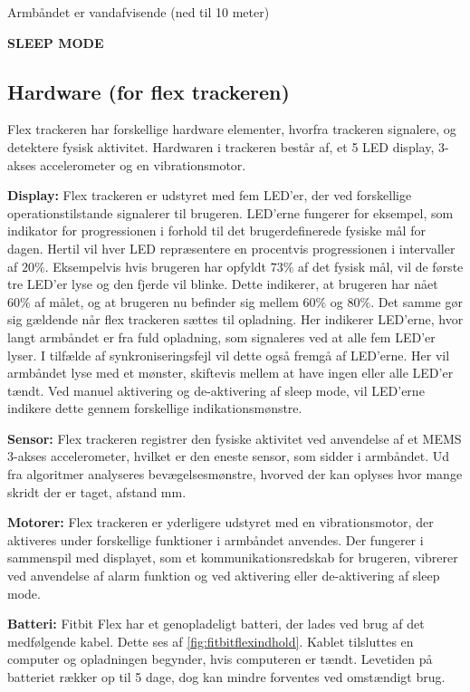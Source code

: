 Armbåndet er vandafvisende (ned til 10 meter) 

\textbf{SLEEP MODE}


\subsection{Hardware (for flex trackeren)}
Flex trackeren har forskellige hardware elementer, hvorfra trackeren signalere, og detektere fysisk aktivitet. Hardwaren i trackeren består af, et 5 LED display, 3-akses accelerometer og en vibrationsmotor.
 
\textbf{Display:} 
Flex trackeren er udstyret med fem LED'er, der ved forskellige operationstilstande signalerer til brugeren. 
LED'erne fungerer for eksempel, som indikator for progressionen i forhold til det brugerdefinerede fysiske mål for dagen. Hertil vil hver LED repræsentere en procentvis progressionen i intervaller af $20 \%$. Eksempelvis hvis brugeren har opfyldt $73 \%$ af det fysisk mål, vil de første tre LED'er lyse og den fjerde vil blinke. Dette indikerer, at brugeren har nået $60 \%$ af målet, og at brugeren nu befinder sig mellem $60 \%$ og $80 \%$. 
Det samme gør sig gældende når flex trackeren sættes til opladning. Her indikerer LED'erne, hvor langt armbåndet er fra fuld opladning, som signaleres ved at alle fem LED'er lyser. 
I tilfælde af synkroniseringsfejl vil dette også fremgå af LED'erne. Her vil armbåndet lyse med et mønster, skiftevis mellem at have ingen eller alle LED'er tændt. 
Ved manuel aktivering og de-aktivering af sleep mode, vil LED'erne indikere dette gennem forskellige indikationsmønstre.

\textbf{Sensor:} 
Flex trackeren registrer den fysiske aktivitet ved anvendelse af et MEMS 3-akses accelerometer, hvilket er den eneste sensor, som sidder i armbåndet. Ud fra algoritmer analyseres bevægelsesmønstre, hvorved der kan oplyses hvor mange skridt der er taget, afstand mm. 

\textbf{Motorer:}
Flex trackeren er yderligere udstyret med en vibrationsmotor, der aktiveres under forskellige funktioner i armbåndet anvendes. Der fungerer i sammenspil med displayet, som et kommunikationsredskab for brugeren, vibrerer ved anvendelse af alarm funktion og ved aktivering eller de-aktivering af sleep mode. 
 
\textbf{Batteri:} 
Fitbit Flex har et genopladeligt batteri, der lades ved brug af det medfølgende kabel. Dette ses af \autoref{fig:fitbitflexindhold}. Kablet tilsluttes en computer og opladningen begynder, hvis computeren er tændt. 
Levetiden på batteriet rækker op til 5 dage, dog kan mindre forventes ved omstændigt brug.


